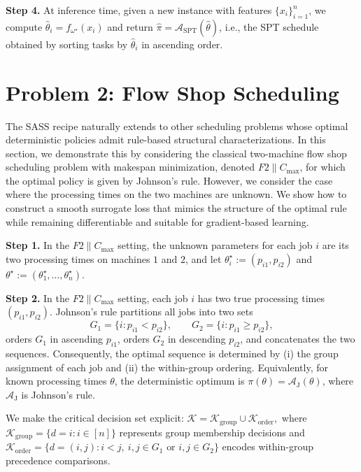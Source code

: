 \documentclass{article}
\begin{document}
\noindent\textbf{Step 4.} At inference time, given a new instance with features $\{x_i\}_{i=1}^n$, we
compute $\hat{\theta}_i=f_{\omega^\star}(x_i)$ and return
$\hat{\pi}=\mathcal{A}_{\mathrm{SPT}}(\hat{\theta})$, i.e., the SPT schedule
obtained by sorting tasks by $\hat{\theta}_i$ in ascending order.

\section{Problem 2: Flow Shop Scheduling}
\label{sec:flowshop}

The SASS recipe naturally extends
to other scheduling problems whose optimal deterministic policies admit rule-based
structural characterizations.
In this section, we demonstrate this by considering
the classical two-machine flow shop scheduling problem with makespan minimization,
denoted $F2\|C_{\max}$, for which the optimal policy is given by Johnson’s rule.
However, we consider the case where the processing times on the two machines are unknown. 
We show how to construct a smooth surrogate loss that mimics the structure of
the optimal rule while remaining differentiable and suitable for gradient-based
learning.

\noindent\textbf{Step 1.}
In the $F2\|C_{\max}$ setting, the unknown parameters for each job $i$ are its
two processing times on machines $1$ and $2$, and let
$\theta_i^\star := (p_{i1},p_{i2})$ and
$\theta^\star := (\theta_1^\star,\dots,\theta_n^\star)$.

\noindent\textbf{Step 2.}
In the $F2\|C_{\max}$ setting, each job $i$ has two true processing times $(p_{i1}, p_{i2})$.
Johnson’s rule partitions all jobs into two sets
\[
G_1 = \{ i : p_{i1} < p_{i2} \}, 
\qquad
G_2 = \{ i : p_{i1} \ge p_{i2} \},
\]
orders $G_1$ in ascending $p_{i1}$, orders $G_2$ in descending $p_{i2}$, and 
concatenates the two sequences.
Consequently, the optimal sequence is determined by (i) the group assignment of each job and (ii) the within-group ordering.
Equivalently, for known processing times $\theta$, the deterministic optimum is
\(
\pi(\theta)=\mathcal{A}_{\mathrm{J}}(\theta)
\),
where $\mathcal{A}_{\mathrm{J}}$ is Johnson's rule.

We make the critical decision set explicit:
\(
\mathcal{K}=\mathcal{K}_{\mathrm{group}}\cup\mathcal{K}_{\mathrm{order}},
\)
where $\mathcal{K}_{\mathrm{group}}=\{d=i: i\in[n]\}$ represents group membership decisions and $\mathcal{K}_{\mathrm{order}}=\{d=(i,j): i<j,\ i,j \in G_1 \text{ or } i,j \in G_2\}$ encodes within-group precedence comparisons.
\end{document}

